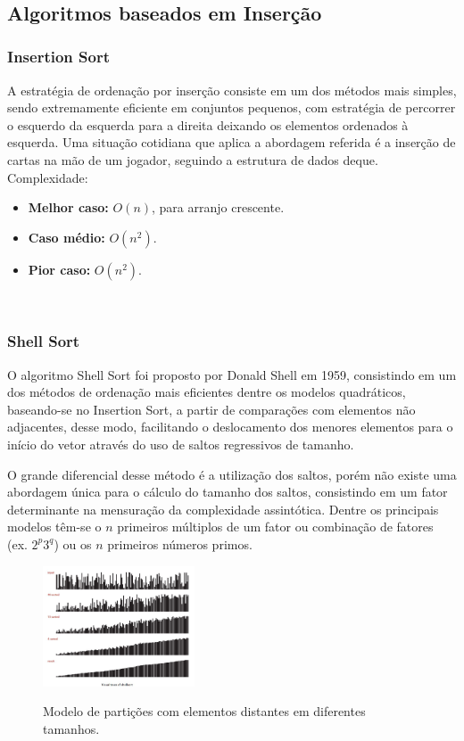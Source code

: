 \documentclass[conference]{IEEEtran}
\begin{document}
~\\
\subsection{Algoritmos baseados em Inserção}

\subsubsection{Insertion Sort}

A estratégia de ordenação por inserção consiste em um dos métodos mais simples, sendo extremamente eficiente em conjuntos pequenos, com estratégia de percorrer o esquerdo da esquerda para a direita deixando os elementos ordenados  à esquerda. Uma situação cotidiana que aplica a abordagem referida é a inserção de cartas na mão de um jogador, seguindo a estrutura de dados deque.\\

Complexidade:
\begin{itemize}
\item \textbf{Melhor caso:} $O (n)$, para arranjo crescente.
\item \textbf{Caso médio:} $O (n^2)$.
\item \textbf{Pior caso:} $O (n^2)$.
\end{itemize}

~\\
\subsubsection{Shell Sort}

O algoritmo Shell Sort foi proposto por Donald Shell em 1959, consistindo em um dos métodos de ordenação mais eficientes dentre os modelos quadráticos, baseando-se no Insertion Sort, a partir de comparações com elementos não adjacentes, desse modo, facilitando o deslocamento dos menores elementos para o início do vetor através do uso de saltos regressivos de tamanho.

O grande diferencial desse método é a utilização dos saltos, porém não existe uma abordagem única para o cálculo do tamanho dos saltos, consistindo em um fator determinante na mensuração da complexidade assintótica. Dentre os principais modelos têm-se o $n$ primeiros múltiplos de um fator ou combinação de fatores (ex. $2^p3^q$) ou os $n$ primeiros números primos.

\begin{figure}
  \caption{Modelo de partições com elementos distantes em diferentes tamanhos.}
  \centering
    \includegraphics[width=0.4\textwidth]{images/shell.jpg}
    \label{image:shell}
\end{figure}
\end{document}
